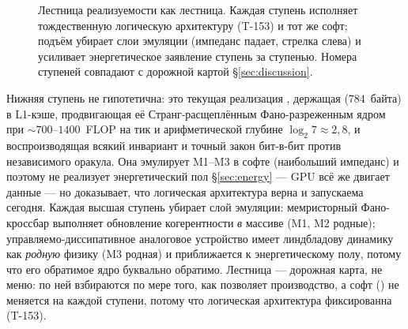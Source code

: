 \begin{figure}[H]
\centering
{}
\caption{Лестница реализуемости как лестница. Каждая ступень исполняет
тождественную логическую архитектуру (T-153) и тот же софт; подъём убирает
слои эмуляции (импеданс падает, стрелка слева) и усиливает энергетическое
заявление ступень за ступенью. Номера ступеней совпадают с дорожной картой
\S\ref{sec:discussion}.}
\label{fig:ladderfig}
\end{figure}

Нижняя ступень не гипотетична: это текущая реализация \SYNARC{}, держащая
\DM{} ($784$~байта) в L1-кэше, продвигающая её Странг-расщеплённым
Фано-разреженным ядром при $\sim\!700$--$1400$~FLOP на тик и арифметической
глубине $\log_2 7\approx 2{,}8$, и воспроизводящая всякий инвариант и точный
закон бит-в-бит против независимого оракула. Она эмулирует M1--M3 в софте
(наибольший импеданс) и поэтому не реализует энергетический пол \S\ref{sec:energy}
--- GPU всё же двигает данные --- но доказывает, что логическая архитектура верна
и запускаема сегодня. Каждая высшая ступень убирает слой эмуляции: мемристорный
Фано-кроссбар выполняет обновление когерентности \emph{в} массиве (M1, M2 родные);
управляемо-диссипативное аналоговое устройство имеет линдбладову динамику как
\emph{родную} физику (M3 родная) и приближается к энергетическому полу, потому
что его обратимое ядро буквально обратимо. Лестница --- дорожная карта, не меню:
по ней взбираются по мере того, как позволяет производство, а софт (\SYNARC{}) не
меняется на каждой ступени, потому что логическая архитектура фиксированна (T-153).
